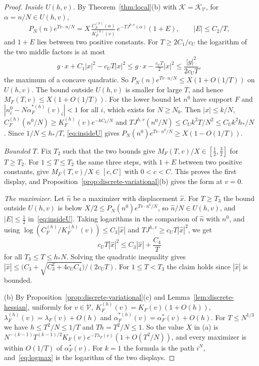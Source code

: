 \begin{proof}
\emph{Inside $U(h,v)$.} By Theorem~\ref{thm:local}(b) with
$\mathcal K=\mathcal K_{\mathcal V}$, for $\alpha=n/N\in U(h,v)$,
\begin{equation}\label{eq:insideU}
P_N(n)e^{Tv\cdot n/N}=X\,\tfrac{C^{(h)}_F(\alpha)}{K^{(h)}_F(v)}\,e^{-TJ^{h,v}(\alpha)}(1+E),
\qquad|E|\le C_2/T,
\end{equation}
and $1+E$ lies between two positive constants. For $T\ge2C_1/c_U$ the logarithm of
the two middle factors is at most
\[
g\cdot x+C_1|x|^2-c_UT|x|^2\le g\cdot x-\tfrac{c_UT}2|x|^2\le\frac{|g|^2}{2c_UT},
\]
the maximum of a concave quadratic. So $P_N(n)e^{Tv\cdot n/N}\le X(1+O(1/T))$ on
$U(h,v)$. The bound outside $U(h,v)$ is smaller for large $T$, and hence
$M_F(T,v)\le X(1+O(1/T))$. For the lower bound let $n^0$ have support $F$ and
$|n^0_i-N\alpha^{*(h)}_F(v)_i|<1$ for all $i$, which exists for $N\ge N_0$. Then
$|x|\le k/N$, $C^{(h)}_F(n^0/N)\ge K^{(h)}_F(v)e^{-kC_3/N}$ and
$TJ^{h,v}(n^0/N)\le C_Uk^2T/N^2\le C_Uk^2h_*/N$. Since $1/N\le h_*/T$,
\eqref{eq:insideU} gives $P_N(n^0)e^{Tv\cdot n^0/N}\ge X(1-O(1/T))$.

\emph{Bounded $T$.} Fix $T_2$ such that the two bounds give
$M_F(T,v)/X\in[\frac12,\frac32]$ for $T\ge T_2$. For $1\le T\le T_2$ the same three
steps, with $1+E$ between two positive constants, give $M_F(T,v)/X\in[c,C]$ with
$0<c<C$. This proves the first display, and Proposition~\ref{prop:discrete-variational}(b)
gives the form at $v=0$.

\emph{The maximizer.} Let $\hat n$ be a maximizer with displacement $\hat x$. For
$T\ge T_3$ the bound outside $U(h,v)$ is below $X/2\le P_N(n^0)e^{Tv\cdot n^0/N}$, so
$\hat n/N\in U(h,v)$, and $|E|\le\frac12$ in~\eqref{eq:insideU}. Taking logarithms in
the comparison of $\hat n$ with $n^0$, and using
$\log(C^{(h)}_F/K^{(h)}_F(v))\le C_3|\hat x|$ and $TJ^{h,v}\ge c_UT|\hat x|^2$, we get
\[
c_UT|\hat x|^2\le C_3|\hat x|+\frac{C_4}T
\]
for all $T_3\le T\le h_*N$. Solving the quadratic inequality gives
$|\hat x|\le\bigl(C_3+\sqrt{C_3^2+4c_UC_4}\bigr)/(2c_UT)$. For $1\le T<T_3$ the claim
holds since $|\hat x|$ is bounded.

(b) By Proposition~\ref{prop:discrete-variational}(c) and
Lemma~\ref{lem:discrete-hessian}, uniformly for $v\in\mathcal V$,
$K^{(h)}_F(v)=K_F(v)(1+O(h))$, $\lambda^{(h)}_F(v)=\lambda_F(v)+O(h)$ and
$\alpha^{*(h)}_F(v)=\alpha^*_F(v)+O(h)$. For $T\le N^{1/3}$ we have
$h\le T^2/N\le1/T$ and $Th=T^2/N\le1$. So the value $X$ in (a) is
$N^{-(k-1)}T^{(k-1)/2}K_F(v)e^{-T\lambda_F(v)}(1+O(T^2/N))$, and every maximizer is
within $O(1/T)$ of $\alpha^*_F(v)$. For $k=1$ the formula is the path $i^N$,
and~\eqref{eq:logmax} is the logarithm of the two displays.


\end{proof}
